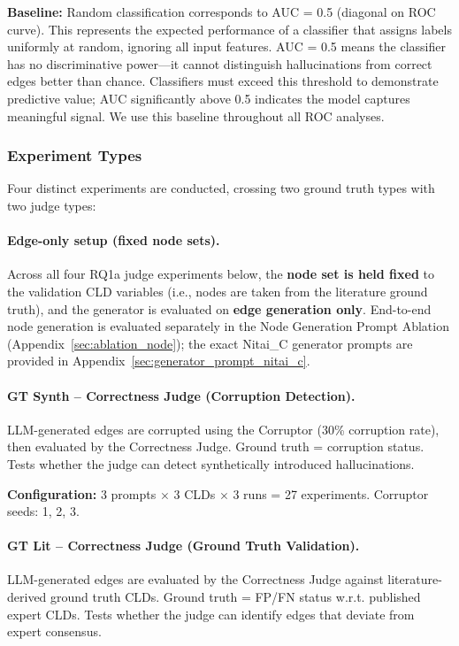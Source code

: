 \textbf{Baseline:} Random classification corresponds to AUC = 0.5 (diagonal on ROC curve). This represents the expected performance of a classifier that assigns labels uniformly at random, ignoring all input features. AUC = 0.5 means the classifier has no discriminative power---it cannot distinguish hallucinations from correct edges better than chance. Classifiers must exceed this threshold to demonstrate predictive value; AUC significantly above 0.5 indicates the model captures meaningful signal. We use this baseline throughout all ROC analyses.

\subsubsection{Experiment Types}

Four distinct experiments are conducted, crossing two ground truth types with two judge types:

\paragraph{Edge-only setup (fixed node sets).}
Across all four RQ1a judge experiments below, the \textbf{node set is held fixed} to the validation CLD variables (i.e., nodes are taken from the literature ground truth), and the generator is evaluated on \textbf{edge generation only}. End-to-end node generation is evaluated separately in the Node Generation Prompt Ablation (Appendix~\ref{sec:ablation_node}); the exact Nitai\_C generator prompts are provided in Appendix~\ref{sec:generator_prompt_nitai_c}.

\paragraph{GT Synth -- Correctness Judge (Corruption Detection).}
LLM-generated edges are corrupted using the Corruptor (30\% corruption rate), then evaluated by the Correctness Judge. Ground truth = corruption status. Tests whether the judge can detect synthetically introduced hallucinations.

\textbf{Configuration:} 3 prompts $\times$ 3 CLDs $\times$ 3 runs = 27 experiments. Corruptor seeds: 1, 2, 3.

\paragraph{GT Lit -- Correctness Judge (Ground Truth Validation).}
LLM-generated edges are evaluated by the Correctness Judge against literature-derived ground truth CLDs. Ground truth = FP/FN status w.r.t. published expert CLDs. Tests whether the judge can identify edges that deviate from expert consensus.

